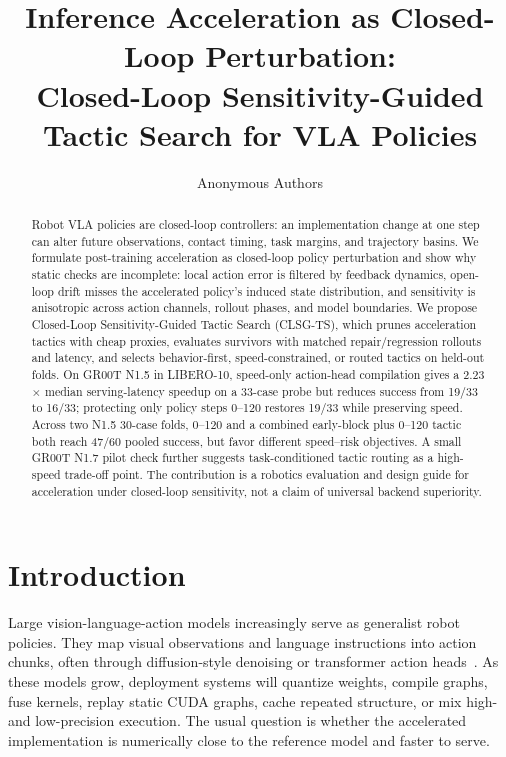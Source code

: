 \documentclass[letterpaper,10pt,twocolumn]{article}
\title{\bfseries\Large
Inference Acceleration as Closed-Loop Perturbation:\\
Closed-Loop Sensitivity-Guided Tactic Search for VLA Policies}
\author{Anonymous Authors}
\date{}
\begin{document}
\maketitle

\begin{abstract}
Robot VLA policies are closed-loop controllers: an implementation change at one step can alter future observations, contact timing, task margins, and trajectory basins. We formulate post-training acceleration as closed-loop policy perturbation and show why static checks are incomplete: local action error is filtered by feedback dynamics, open-loop drift misses the accelerated policy's induced state distribution, and sensitivity is anisotropic across action channels, rollout phases, and model boundaries. We propose Closed-Loop Sensitivity-Guided Tactic Search (CLSG-TS), which prunes acceleration tactics with cheap proxies, evaluates survivors with matched repair/regression rollouts and latency, and selects behavior-first, speed-constrained, or routed tactics on held-out folds. On GR00T N1.5 in LIBERO-10, speed-only action-head compilation gives a 2.23$\times$ median serving-latency speedup on a 33-case probe but reduces success from 19/33 to 16/33; protecting only policy steps 0--120 restores 19/33 while preserving speed. Across two N1.5 30-case folds, 0--120 and a combined early-block plus 0--120 tactic both reach 47/60 pooled success, but favor different speed--risk objectives. A small GR00T N1.7 pilot check further suggests task-conditioned tactic routing as a high-speed trade-off point. The contribution is a robotics evaluation and design guide for acceleration under closed-loop sensitivity, not a claim of universal backend superiority.
\end{abstract}

\section{Introduction}

Large vision-language-action models increasingly serve as generalist robot policies. They map visual observations and language instructions into action chunks, often through diffusion-style denoising or transformer action heads~\citep{rt1,rt2,openvla,grootn1,diffusionpolicy}. As these models grow, deployment systems will quantize weights, compile graphs, fuse kernels, replay static CUDA graphs, cache repeated structure, or mix high- and low-precision execution. The usual question is whether the accelerated implementation is numerically close to the reference model and faster to serve.
\end{document}

